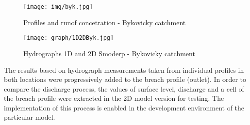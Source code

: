 \begin{figure}[ht!]
\centering
\texttt{[image: img/byk.jpg]}
\caption{Profiles and runof concetration - Bykovicky catchment }
\label{fig:horany}
\end{figure}\FloatBarrier

\begin{figure}[ht!]
\renewcommand{\figurename}{Graf}
\centering
\texttt{[image: graph/1D2DByk.jpg]}
\caption{Hydrographs 1D and 2D Smoderp - Bykovicky catchment}
\label{graf:graf_1}
\end{figure}\FloatBarrier

The results based on hydrograph measurements taken from individual profiles in both locations were progressively added to the breach profile (outlet). In order to compare the discharge process, the values of surface level, discharge and a cell of the breach profile were extracted in the 2D model version for testing. The implementation of this process is enabled in the development environment of the particular model.